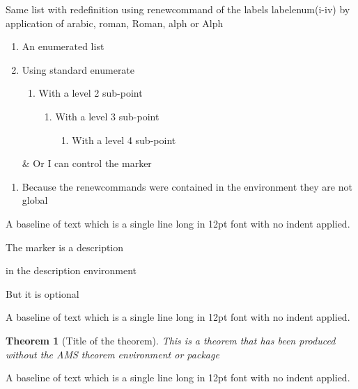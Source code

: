 \documentclass[12pt,a4paper,onecolumn]{article}
\newtheorem{theorem}{Theorem}[section]
\begin{document}
Same list with redefinition using renewcommand of the labels labelenum(i-iv) by application of arabic, roman, Roman, alph or Alph
\begin{enumerate}
\renewcommand{\labelenumi}{\Roman{enumi}.}
\renewcommand{\labelenumii}{\roman{enumii}.}
\renewcommand{\labelenumiii}{\Alph{enumiii}.}
\renewcommand{\labelenumiv}{\alph{enumiv}.}
\item An enumerated list
\item Using standard enumerate
\begin{enumerate}
\item With a level 2 sub-point
\begin{enumerate}
\item With a level 3 sub-point
\begin{enumerate}
\item With a level 4 sub-point
\end{enumerate}
\end{enumerate}
\end{enumerate}
\item[\&] Or I can control the marker
\end{enumerate}

\begin{enumerate}
\item Because the renewcommands were contained in the environment they are not global
\end{enumerate}

\noindent
A baseline of text which is a single line long in 12pt font with no indent applied.

\begin{description}
\item[first] The marker is a description
\item[second] in the description environment
\item But it is optional
\end{description}


\noindent
A baseline of text which is a single line long in 12pt font with no indent applied.

\begin{theorem}[Title of the theorem]
This is a theorem that has been produced without the AMS theorem environment or package
\end{theorem}

\noindent
A baseline of text which is a single line long in 12pt font with no indent applied.
\end{document}
